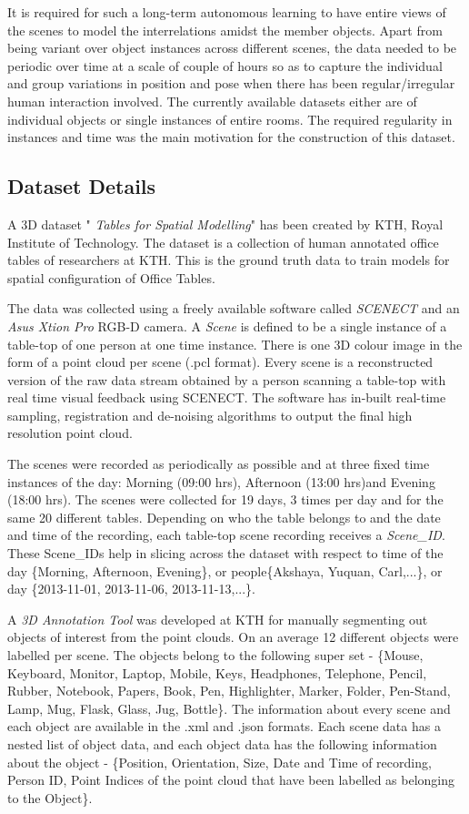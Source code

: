\documentclass[letterpaper, 10 pt, conference]{ieeeconf}  %
\begin{document}
It is required for such a long-term autonomous learning to have entire views of the scenes to model the interrelations amidst the member objects. Apart from being variant over object instances across different scenes, the data needed to be periodic over time at a scale of couple of hours so as to capture the individual and group variations in position and pose when there has been regular/irregular human interaction involved. The currently available datasets either are of individual objects or single instances of entire rooms. The required regularity in instances and time was the main motivation for the construction of this dataset.

\subsection{Dataset Details}
A 3D dataset " \textit{Tables for Spatial Modelling}" has been created by KTH, Royal Institute of Technology. The dataset is a collection of human annotated office tables of researchers at KTH. This is the ground truth data to train models for spatial configuration of Office Tables.

The data was collected using a freely available software called \textit{SCENECT} \cite{} and an \textit{Asus Xtion Pro} RGB-D camera. A \textit{Scene} is defined to be a single instance of a table-top of one person at one time instance. There is one 3D colour image in the form of a point cloud per scene (.pcl format). Every scene is a reconstructed version of the raw data stream obtained by a person scanning a table-top with real time visual feedback using SCENECT. The software has in-built real-time sampling, registration and de-noising algorithms to output the final high resolution point cloud.

The scenes were recorded as periodically as possible and at three fixed time instances of the day: Morning (09:00 hrs), Afternoon (13:00 hrs)and Evening (18:00 hrs). The scenes were collected for 19 days, 3 times per day and for the same 20 different tables. Depending on who the table belongs to and the date and time of the recording, each table-top scene recording receives a \textit{Scene\_ID}. These Scene\_IDs help in slicing across the dataset with respect to time of the day \{Morning, Afternoon, Evening\}, or people\{Akshaya, Yuquan, Carl,...\}, or day \{2013-11-01, 2013-11-06, 2013-11-13,...\}.

A \textit{3D Annotation Tool} was developed at KTH for manually segmenting out objects of interest from the point clouds. On an average 12 different objects were labelled per scene. The objects belong to the following super set - \{Mouse, Keyboard, Monitor, Laptop, Mobile, Keys, Headphones, Telephone, Pencil, Rubber, Notebook, Papers,  Book, Pen, Highlighter, Marker, Folder, Pen-Stand, Lamp, Mug, Flask, Glass, Jug, Bottle\}. The information about every scene and each object are available in the .xml and .json formats. Each scene data has a nested list of object data, and each object data has the following information about the object - \{Position, Orientation, Size, Date and Time of recording, Person ID, Point Indices of the point cloud that have been labelled as belonging to the Object\}.
\end{document}
